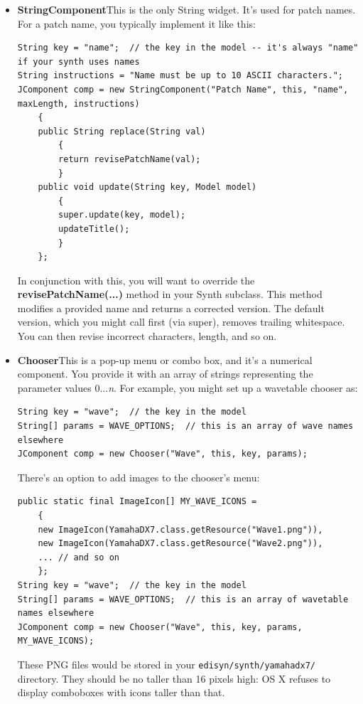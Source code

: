 \documentclass{article}
\begin{document}
\begin{itemize}
\item {\bf StringComponent}\quad This is the only String widget.  It's used for patch names.  For a patch name, you typically implement it like this:
\begin{verbatim}
String key = "name";  // the key in the model -- it's always "name" if your synth uses names
String instructions = "Name must be up to 10 ASCII characters.";
JComponent comp = new StringComponent("Patch Name", this, "name", maxLength, instructions)
    {
    public String replace(String val)
        {
        return revisePatchName(val);
        }
    public void update(String key, Model model)
        {
        super.update(key, model);
        updateTitle();
        }
    };
\end{verbatim}

In conjunction with this, you will want to override the {\bf revisePatchName(...)} method in your Synth subclass.  This method modifies a provided name and returns a corrected version.  The default version, which you might call first (via super), removes trailing whitespace.  You can then revise incorrect characters, length, and so on.

\item {\bf Chooser}\quad This is a pop-up menu or combo box, and it's a numerical component.  You provide it with an array of strings representing the parameter values 0...{\it n}.  For example, you might set up a wavetable chooser as:

\begin{verbatim}
String key = "wave";  // the key in the model
String[] params = WAVE_OPTIONS;  // this is an array of wave names elsewhere
JComponent comp = new Chooser("Wave", this, key, params);
\end{verbatim}

There's an option to add images to the chooser's menu:

\begin{verbatim}
public static final ImageIcon[] MY_WAVE_ICONS = 
    {
    new ImageIcon(YamahaDX7.class.getResource("Wave1.png")),
    new ImageIcon(YamahaDX7.class.getResource("Wave2.png")),
    ... // and so on
    };
String key = "wave";  // the key in the model
String[] params = WAVE_OPTIONS;  // this is an array of wavetable names elsewhere
JComponent comp = new Chooser("Wave", this, key, params, MY_WAVE_ICONS);
\end{verbatim}

These PNG files would be stored in your {\tt edisyn/synth/yamahadx7/} directory.  They should be no taller than 16 pixels high: OS X refuses to display comboboxes with icons taller than that.



\end{itemize}
\end{document}
